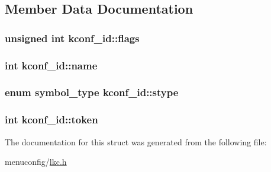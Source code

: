 \subsection{Member Data Documentation}
\hypertarget{structkconf__id_a404b8ac9cb0e343ca20a7cf4247528e8}{
\subsubsection[{flags}]{\setlength{\rightskip}{0pt plus 5cm}unsigned int kconf\-\_\-id\-::flags}}\label{structkconf__id_a404b8ac9cb0e343ca20a7cf4247528e8}
\hypertarget{structkconf__id_a1357a22bd80040da9b13c168460407b1}{
\subsubsection[{name}]{\setlength{\rightskip}{0pt plus 5cm}int kconf\-\_\-id\-::name}}\label{structkconf__id_a1357a22bd80040da9b13c168460407b1}
\hypertarget{structkconf__id_ac37c179c1795cafc1d7b795010c9e80e}{
\subsubsection[{stype}]{\setlength{\rightskip}{0pt plus 5cm}enum {\bf symbol\-\_\-type} kconf\-\_\-id\-::stype}}\label{structkconf__id_ac37c179c1795cafc1d7b795010c9e80e}
\hypertarget{structkconf__id_a4576c55c736cbb6fdb1638d098a82c9f}{
\subsubsection[{token}]{\setlength{\rightskip}{0pt plus 5cm}int kconf\-\_\-id\-::token}}\label{structkconf__id_a4576c55c736cbb6fdb1638d098a82c9f}


The documentation for this struct was generated from the following file\-:\begin{DoxyCompactItemize}
\item 
menuconfig/\hyperlink{lkc_8h}{lkc.\-h}\end{DoxyCompactItemize}
